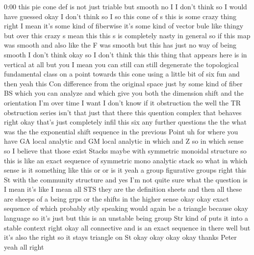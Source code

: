 \begin{unfinished}{0:00}
this  pie  cone  def  is  not  just  triable
but
smooth
no  I
I  don't  think
so  I  would  have  guessed  okay  I  don't
think
so  I  so  this  cone  of  s  this  is  some
crazy  thing  right  I  mean  it's  some  kind
of  fiberwise  it's  some  kind  of  vector
bule  like  thingy  but  over  this  crazy  s
mean  this  this  s  is  completely  nasty  in
general  so  if  this  map  was  smooth  and
also  like  the  F  was  smooth  but  this  has
just  no  way  of  being  smooth  I  don't
think
okay  so  I  don't  think  this  this  thing
that  appears  here  is  in  vertical  at  all
but  you  I  mean  you  can  still  can  still
degenerate  the  topological  fundamental
class  on  a  point  towards  this  cone  using
a  little  bit  of  six  fun  and  then  yeah
this  Con  difference  from  the  original
space  just  by  some  kind  of  fiber  BS
which  you  can  analyze  and  which  give  you
both  the  dimension  shift  and  the
orientation  I'm  over
time  I  want  I  don't  know  if
it  obstruction
the  well  the  TR  obstruction  series  isn't
that  just  that  there  this  quention
complex  that  behaves
right  okay  that's  just  completely  infil
this
six  any  further
questions  the  the  what  was  the  the
exponential  shift  sequence  in  the
previous  Point  uh  for
where  you  have  GA  local  analytic  and  GM
local  analytic  in  which  and  Z  so  in
which  sense  so  I  believe  that  those
exist  Stacks  maybe  with  symmetric
monoidal  structure  so  this  is  like  an
exact  sequence  of  symmetric  mono
analytic  stack  so  what  in  which  sense  is
it  something  like  this  or  or  is  it  yeah
a  group  figurative  groups
right  this  St  with  the  community
structure
and  yes  I'm  not  quite  sure  what  the
question  is  I  mean  it's  like  I  mean  all
STS  they
are  the  definition  sheets  and  then  all
these  are  sheeps  of  a  being  grps
or  the  shifts  in  the  higher  sense  okay
okay  exact  sequence
of  which  probably  stly  speaking  would
again  be  a  triangle  because
okay  language  so  it's  just  but  this  is
an
unstable  being  group  Str  kind  of  puts  it
into  a  stable  context
right
okay  all  connective  and  is  an  exact
sequence  in  there  well  but  it's  also  the
right  so  it
stays  triangle  on
St  okay  okay
okay
okay  thanks  Peter  yeah  all
right
\end{unfinished}